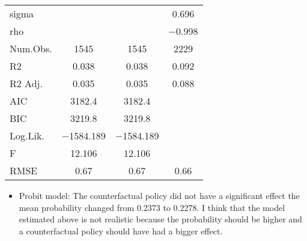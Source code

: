 \documentclass{article}
\begin{document}
\begin{table}
\begin{tabular}[t]{lccc}
sigma &  &  & \num{0.696}\\
rho &  &  & \num{-0.998}\\
\midrule
Num.Obs. & \num{1545} & \num{1545} & \num{2229}\\
R2 & \num{0.038} & \num{0.038} & \num{0.092}\\
R2 Adj. & \num{0.035} & \num{0.035} & \num{0.088}\\
AIC & \num{3182.4} & \num{3182.4} & \\
BIC & \num{3219.8} & \num{3219.8} & \\
Log.Lik. & \num{-1584.189} & \num{-1584.189} & \\
F & \num{12.106} & \num{12.106} & \\
RMSE & \num{0.67} & \num{0.67} & \num{0.66}\\
\bottomrule
\end{tabular}
\end{table}




\begin{itemize}
\item Probit model: The counterfactual policy did not have a significant effect the mean probability changed from 0.2373 to 0.2278. I think that the model estimated above is not realistic because the probability should be higher and a counterfactual policy should have had a bigger effect.

\end{itemize}
\end{document}
